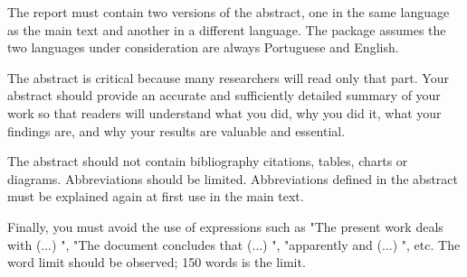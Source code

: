\abstractEN %

The report must contain two versions of the abstract, one in the same language as the main text and another in a different language. The package assumes the two languages under consideration are always Portuguese and English. 

The abstract is critical because many researchers will read only that part. Your abstract should provide an accurate and sufficiently detailed summary of your work so that readers will understand what you did, why you did it, what your findings are, and why your results are valuable and essential. 

The abstract should not contain bibliography citations, tables, charts or diagrams. Abbreviations should be limited. Abbreviations defined in the abstract must be explained again at first use in the main text. 

Finally, you must avoid the use of expressions such as "The present work deals with ($\ldots$) ", "The document concludes that ($\ldots$) ", "apparently and ($\ldots$) ", etc. The word limit should be observed; 150 words is the limit.